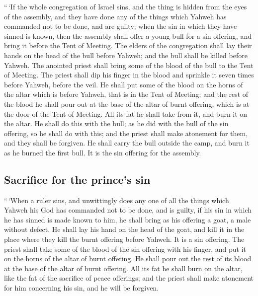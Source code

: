  ``\,`If the whole congregation of Israel sins, and the
thing is hidden from the eyes of the assembly, and they have done any of
the things which Yahweh has commanded not to be done, and are guilty;
 when the sin in which they have sinned is known, then
the assembly shall offer a young bull for a sin offering, and bring it
before the Tent of Meeting.  The elders of the
congregation shall lay their hands on the head of the bull before
Yahweh; and the bull shall be killed before Yahweh.  The
anointed priest shall bring some of the blood of the bull to the Tent of
Meeting.  The priest shall dip his finger in the blood
and sprinkle it seven times before Yahweh, before the veil.
 He shall put some of the blood on the horns of the altar
which is before Yahweh, that is in the Tent of Meeting; and the rest of
the blood he shall pour out at the base of the altar of burnt offering,
which is at the door of the Tent of Meeting.  All its fat
he shall take from it, and burn it on the altar.  He
shall do this with the bull; as he did with the bull of the sin
offering, so he shall do with this; and the priest shall make atonement
for them, and they shall be forgiven.  He shall carry the
bull outside the camp, and burn it as he burned the first bull. It is
the sin offering for the assembly.

\hypertarget{sacrifice-for-the-princes-sin}{%
\subsection{Sacrifice for the prince's
sin}\label{sacrifice-for-the-princes-sin}}

 ``\,`When a ruler sins, and unwittingly does any one of
all the things which Yahweh his God has commanded not to be done, and is
guilty,  if his sin in which he has sinned is made known
to him, he shall bring as his offering a goat, a male without defect.
 He shall lay his hand on the head of the goat, and kill
it in the place where they kill the burnt offering before Yahweh. It is
a sin offering.  The priest shall take some of the blood
of the sin offering with his finger, and put it on the horns of the
altar of burnt offering. He shall pour out the rest of its blood at the
base of the altar of burnt offering.  All its fat he
shall burn on the altar, like the fat of the sacrifice of peace
offerings; and the priest shall make atonement for him concerning his
sin, and he will be forgiven.

